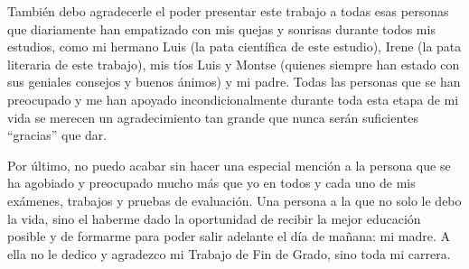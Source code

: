 También debo agradecerle el poder presentar este trabajo a todas esas personas que diariamente han empatizado con mis quejas y sonrisas durante todos mis estudios, como mi hermano Luis (la pata científica de este estudio), Irene (la pata literaria de este trabajo), mis tíos Luis y Montse (quienes siempre han estado con sus geniales consejos y buenos ánimos) y mi padre. Todas las personas que se han preocupado y me han apoyado incondicionalmente durante toda esta etapa de mi vida se merecen un agradecimiento tan grande que nunca serán suficientes ``gracias'' que dar.

Por último, no puedo acabar sin hacer una especial mención a la persona que se ha agobiado y preocupado mucho más que yo en todos y cada uno de mis exámenes, trabajos y pruebas de evaluación. Una persona a la que no solo le debo la vida, sino el haberme dado la oportunidad de recibir la mejor educación posible y de formarme para poder salir adelante el día de mañana: mi madre. A ella no le dedico y agradezco mi Trabajo de Fin de Grado, sino toda mi carrera.